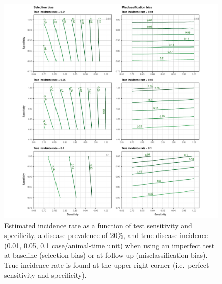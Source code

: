 \documentclass[utf8]{frontiers_suppmat} %
\begin{document}
\begin{figure}[htbp]
  \begin{center}
    \includegraphics[scale=.95]{master-incidence20_contourX-1}
    \end{center}
  \caption{Estimated incidence rate as a function of test sensitivity and
    specificity, a disease prevalence of 20\%, and true disease incidence (0.01,
    0.05, 0.1 case/animal-time unit) when using an imperfect test at baseline
    (selection bias) or at follow-up (misclassification bias). True incidence
    rate is found at the upper right corner (i.e.\ perfect sensitivity and
    specificity).}
  \label{fig:incidence_contourX20}
\end{figure}
\end{document}
